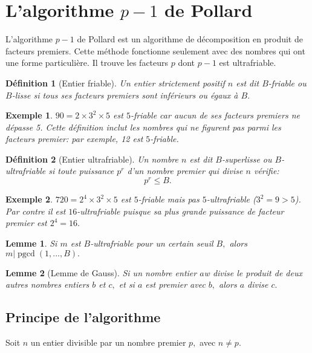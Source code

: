 \documentclass[french, 12pt, titlepage]{article}
\DeclareMathOperator{\pgcd}{pgcd}
\newtheorem{definition}{D{\'e}finition}
\newtheorem{lemme}{Lemme}
\newtheorem{example}{Exemple}
\begin{document}
\section{L'algorithme $p-1$ de Pollard}

L'algorithme $p-1$ de Pollard est un algorithme de décomposition en produit de facteurs premiers. Cette méthode fonctionne seulement avec des nombres qui ont une forme particulière. Il trouve les facteurs $p$ dont $p-1$ est ultrafriable.

\begin{definition}[Entier friable]
Un entier strictement positif $n$ est dit $B$-friable ou $B$-lisse si tous ses facteurs premiers sont inférieurs ou égaux à $B.$ 
\end{definition}
\begin{example}
$90 = 2 \times 3^2 \times 5$ est $5$-friable car aucun de ses facteurs premiers ne dépasse 5.
Cette définition inclut les nombres qui ne figurent pas parmi les facteurs premier: par exemple, 12 est $5$-friable.
\end{example}
\begin{definition}[Entier ultrafriable]
Un nombre $n$ est dit $B$-superlisse ou $B$-ultrafriable si toute puissance $p^r$ d'un nombre premier qui divise $n$ vérifie: \[ p^r \leq B .\]
\end{definition}
\begin{example}
$720 = 2^4 \times 3^2 \times 5$ est $5$-friable mais pas $5$-ultrafriable ($3^2 = 9 > 5$). Par contre il est $16$-ultrafriable puisque sa plus grande puissance de facteur premier est $2^4 = 16.$
\end{example}

\begin{lemme}\label{leme}
Si $m$ est $B$-ultrafriable pour un certain seuil $B,$ alors $m | \pgcd(1,...,B).$
\end{lemme}

\begin{lemme}[Lemme de Gauss]
Si un nombre entier $a$w divise le produit de deux autres nombres entiers $b$ et $c,$ et si $a$ est premier avec $b,$ alors $a$ divise $c.$
\end{lemme}

\subsection{Principe de l'algorithme}

Soit $n$ un entier divisible par un nombre premier $p,$ avec $n \neq p.$ 
\end{document}
